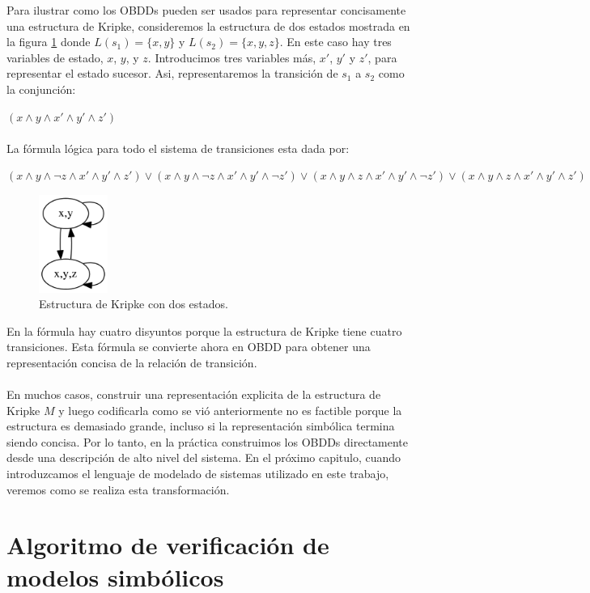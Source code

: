 Para ilustrar como los OBDDs pueden ser usados para representar concisamente una estructura de Kripke, consideremos la estructura de dos estados mostrada en la figura \ref{fig:kripke2} donde $L(s_{1}) = \{x,y\}$ y $L(s_{2}) = \{x,y,z\}$. En este caso hay tres variables de estado, $x$, $y$, y $z$. Introducimos tres variables más, $x'$, $y'$ y $z'$, para representar el estado sucesor. Asi, representaremos la transición de $s_{1}$ a $s_{2}$ como la conjunción:

$(x \land y \land x' \land y' \land z')$\\
\\
La fórmula lógica para todo el sistema de transiciones esta dada por:

$(x \land y \land \neg z \land x' \land y' \land z') \lor (x \land y \land \neg z \land x' \land y' \land \neg z') \lor (x \land y \land z \land x' \land y' \land \neg z') \lor (x \land y \land z \land x' \land y' \land z')$ 
\begin{figure}[H]
  \centering
  \includegraphics[width=0.2\textwidth]{Figures/kripke2.png}
  \caption{Estructura de Kripke con dos estados.}
  \label{fig:kripke2}
\end{figure}

En la fórmula hay cuatro disyuntos porque la estructura de Kripke tiene cuatro transiciones. Esta fórmula se convierte ahora en OBDD para obtener una representación concisa de la relación de transición.\\
\\
En muchos casos, construir una representación explicita de la estructura de Kripke $M$ y luego codificarla como se vió anteriormente no es factible porque la estructura es demasiado grande, incluso si la representación simbólica termina siendo concisa. Por lo tanto, en la práctica construimos los OBDDs directamente desde una descripción de alto nivel del sistema. En el próximo capitulo, cuando introduzcamos el lenguaje de modelado de sistemas utilizado en este trabajo, veremos como se realiza esta transformación.

\section{Algoritmo de verificación de modelos simbólicos}

